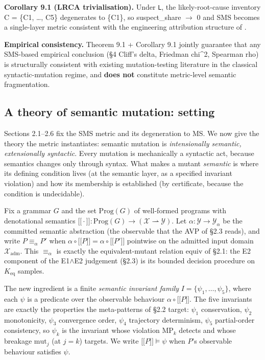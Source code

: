 \documentclass[acmsmall,screen,review]{acmart}
\providecommand{\llbracket}{\mathopen{\lbrack\!\lbrack}}
\providecommand{\rrbracket}{\mathclose{\rbrack\!\rbrack}}
\begin{document}
\textbf{Corollary 9.1 (LRCA trivialisation).} Under \texttt{L}, the
likely-root-cause inventory C = \{C1, \ldots, C5\} degenerates to
\{C1\}, so suspect\_share $\to$ 0 and SMS becomes a single-layer metric
consistent with the engineering attribution structure of
\citet{d7c38286734419b52de4262c9802ebdfcf4b9447}.

\textbf{Empirical consistency.} Theorem 9.1 + Corollary 9.1 jointly
guarantee that any SMS-based empirical conclusion (§4 Cliff's delta,
Friedman chi\^{}2, Spearman rho) is structurally consistent with
existing mutation-testing literature in the classical syntactic-mutation
regime, and \textbf{does not} constitute metric-level semantic
fragmentation.


\subsection{A theory of semantic mutation: setting}\label{theory-setting}

Sections 2.1--2.6 fix the SMS metric and its degeneration to MS. We now
give the theory the metric instantiates: semantic mutation is
\emph{intensionally semantic, extensionally syntactic}. Every mutation
is mechanically a syntactic act, because semantics changes only through
syntax. What makes a mutant \emph{semantic} is where its defining
condition lives (at the semantic layer, as a specified invariant
violation) and how its membership is established (by certificate,
because the condition is undecidable).

Fix a grammar $G$ and the set $\mathrm{Prog}(G)$ of well-formed programs
with denotational semantics
$\llbracket\cdot\rrbracket : \mathrm{Prog}(G) \to (\mathcal{X} \rightharpoonup \mathcal{Y})$.
Let $\alpha : \mathcal{Y} \to \mathcal{Y}_\alpha$ be the committed
semantic abstraction (the observable that the AVP of §2.3 reads), and
write $P \equiv_\alpha P'$ when
$\alpha \circ \llbracket P \rrbracket = \alpha \circ \llbracket P' \rrbracket$
pointwise on the admitted input domain $\mathcal{X}_{\mathrm{adm}}$.
This $\equiv_\alpha$ is exactly the equivalent-mutant relation
$\mathrm{equiv}$ of §2.1: the E2 component of the E1$\wedge$E2 judgement
(§2.3) is its bounded decision procedure on $K_{\mathrm{eq}}$ samples.

The new ingredient is a finite \emph{semantic invariant family}
$I = \{\psi_1, \dots, \psi_5\}$, where each $\psi$ is a predicate over
the observable behaviour $\alpha \circ \llbracket P \rrbracket$. The five
invariants are exactly the properties the meta-patterns of §2.2 target:
$\psi_1$ conservation, $\psi_2$ monotonicity, $\psi_3$ convergence order,
$\psi_4$ trajectory determinism, $\psi_5$ partial-order consistency, so
$\psi_k$ is the invariant whose violation MP$_k$ detects and whose
breakage $\mathrm{mut}_j$ (at $j=k$) targets. We write
$\llbracket P \rrbracket \models \psi$ when $P$'s observable behaviour
satisfies $\psi$.
\end{document}
